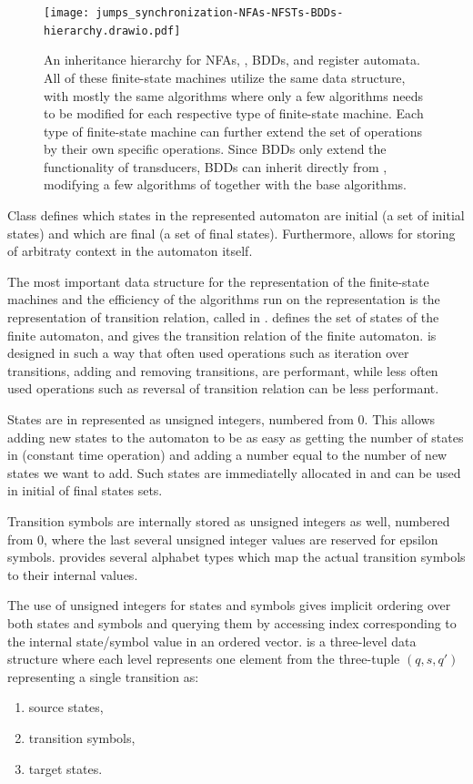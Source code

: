 \begin{figure}[ht]
  \centering
  \texttt{[image: jumps\_synchronization-NFAs-NFSTs-BDDs-hierarchy.drawio.pdf]}
  \caption{
    An inheritance hierarchy for NFAs, \nfts, BDDs, and register automata.
    All of these finite-state machines utilize the same data structure, with mostly the same algorithms where only a few algorithms needs to be modified for each respective type of finite-state machine.
    Each type of finite-state machine can further extend the set of operations by their own specific operations.
    Since BDDs only extend the functionality of transducers, BDDs can inherit directly from \nfts, modifying a few algorithms of \nfts together with the base \nfaClass algorithms.
  }
\end{figure}

Class \nfaClass defines which states in the represented automaton are initial (a set of initial states) and which are final (a set of final states).
Furthermore, \nfaClass allows for storing of arbitraty context in the automaton itself.

The most important data structure for the representation of the finite-state machines and the efficiency of the algorithms run on the representation is the representation of transition relation, called \deltastruct in \mata.
\deltastruct defines the set of states of the finite automaton, and gives the transition relation of the finite automaton.
\deltastruct is designed in such a way that often used operations such as iteration over transitions, adding and removing transitions, are performant, while less often used operations such as reversal of transition relation can be less performant.

States are in \mata represented as unsigned integers, numbered from 0.
This allows adding new states to the automaton to be as easy as getting the number of states in \deltastruct (constant time operation) and adding a number equal to the number of new states we want to add.
Such states are immediatelly allocated in \deltastruct and can be used in initial of final states sets.

Transition symbols are internally stored as unsigned integers as well, numbered from 0, where the last several unsigned integer values are reserved for epsilon symbols.
\mata provides several alphabet types which map the actual transition symbols to their internal values.

The use of unsigned integers for states and symbols gives implicit ordering over both states and symbols and querying them by accessing index corresponding to the internal state/symbol value in an ordered vector.
\deltastruct is a three-level data structure where each level represents one element from the three-tuple $(q, s, q')$ representing a single transition as:
\begin{enumerate}
    \item source states,
    \item transition symbols,
    \item target states.
\end{enumerate}

